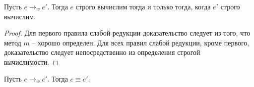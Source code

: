 \begin{lemma}
Пусть $e \rightarrow_w e'$. Тогда $e$ строго вычислим тогда и только тогда, когда $e'$ строго вычислим.
\end{lemma}

\begin{proof}
Для первого правила слабой редукции доказательство следует из того, что метод $m$ -- хорошо определен.
Для всех правил слабой редукции, кроме первого, доказательство следует непосредственно из определения строгой вычислимости.
\end{proof}

\begin{theorem}
Пусть $e \rightarrow_w e'$. Тогда $e \equiv e'$.
\end{theorem}
